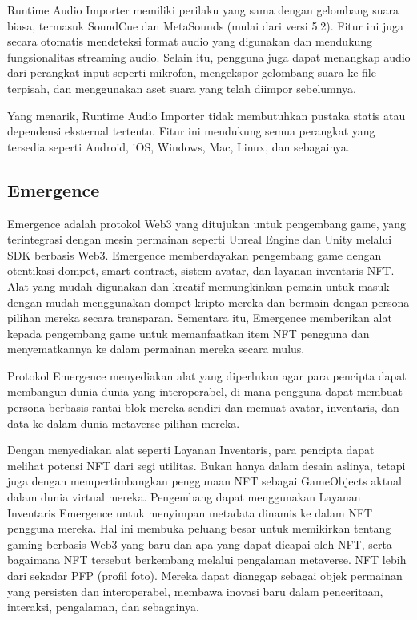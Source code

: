 Runtime Audio Importer memiliki perilaku yang sama dengan gelombang suara biasa, termasuk SoundCue dan MetaSounds (mulai dari versi 5.2). Fitur ini juga secara otomatis mendeteksi format audio yang digunakan dan mendukung fungsionalitas streaming audio. Selain itu, pengguna juga dapat menangkap audio dari perangkat input seperti mikrofon, mengekspor gelombang suara ke file terpisah, dan menggunakan aset suara yang telah diimpor sebelumnya.

Yang menarik, Runtime Audio Importer tidak membutuhkan pustaka statis atau dependensi eksternal tertentu. Fitur ini mendukung semua perangkat yang tersedia seperti Android, iOS, Windows, Mac, Linux, dan sebagainya.

\subsection{Emergence}
Emergence adalah protokol Web3 yang ditujukan untuk pengembang game, yang terintegrasi dengan mesin permainan seperti Unreal Engine dan Unity melalui SDK berbasis Web3. Emergence memberdayakan pengembang game dengan otentikasi dompet, smart contract, sistem avatar, dan layanan inventaris NFT. Alat yang mudah digunakan dan kreatif memungkinkan pemain untuk masuk dengan mudah menggunakan dompet kripto mereka dan bermain dengan persona pilihan mereka secara transparan. Sementara itu, Emergence memberikan alat kepada pengembang game untuk memanfaatkan item NFT pengguna dan menyematkannya ke dalam permainan mereka secara mulus.

Protokol Emergence menyediakan alat yang diperlukan agar para pencipta dapat membangun dunia-dunia yang interoperabel, di mana pengguna dapat membuat persona berbasis rantai blok mereka sendiri dan memuat avatar, inventaris, dan data ke dalam dunia metaverse pilihan mereka.

Dengan menyediakan alat seperti Layanan Inventaris, para pencipta dapat melihat potensi NFT dari segi utilitas. Bukan hanya dalam desain aslinya, tetapi juga dengan mempertimbangkan penggunaan NFT sebagai GameObjects aktual dalam dunia virtual mereka. Pengembang dapat menggunakan Layanan Inventaris Emergence untuk menyimpan metadata dinamis ke dalam NFT pengguna mereka. Hal ini membuka peluang besar untuk memikirkan tentang gaming berbasis Web3 yang baru dan apa yang dapat dicapai oleh NFT, serta bagaimana NFT tersebut berkembang melalui pengalaman metaverse. NFT lebih dari sekadar PFP (profil foto). Mereka dapat dianggap sebagai objek permainan yang persisten dan interoperabel, membawa inovasi baru dalam penceritaan, interaksi, pengalaman, dan sebagainya.

